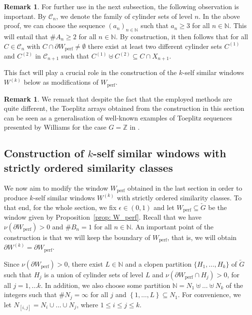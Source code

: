 \documentclass[titlepage,reqno,10pt]{amsart}
\theoremstyle{definition}
\newtheorem{remark}[theorem]{Remark}
\def\Z{{\mathbb Z}}
\def\N{{\mathbb N}}
\newcommand{\set}[1]{\left\{ #1 \right\}}
\newcommand{\tm}{\subseteq}
\begin{document}
\begin{remark}
    \label{rem: number of retained cylinders}
    For further use in the next subsection, the following observation is important. By $\mathcal{C}_n$, we denote the family of cylinder sets of level $n$. In the above proof, we can choose the sequence $(a_n)_{n\in\N}$ such that $a_n\geq 3$ for all $n\in\mathbb{N}$. This will entail that $\# A_n\geq 2$ for all $n\in\N$. By construction, it then follows that for all $C\in \mathcal{C}_n$ with $C\cap \partial W_{\mathrm{perf}}\neq \emptyset$ there exist at least two different cylinder sets $C^{(1)}$ and $C^{(2)}$ in $\mathcal{C}_{n+1}$ such that $C^{(1)}\uplus C^{(2)}\tm C \cap X_{n+1}$. 

    This fact will play a crucial role in the construction of the $k$-self similar windows $W^{(k)}$ below as modifications of $W_\mathrm{perf}$. 
\end{remark}

\begin{remark} 
We remark that despite the fact that the employed methods are quite different, the Toeplitz arrays obtained from the construction in this section can be seen as a generalisation of  well-known examples of Toeplitz sequences presented by Williams for the case $G=\Z$ in \cite[Section 4]{Wi84}. 
\end{remark}

\subsection{Construction of $k$-self similar windows with strictly ordered similarity classes} \label{subsect: k-self similar windows}
We now aim to modify the window $W_\mathrm{perf}$ obtained in the last section in order to produce $k$-self similar windows $W^{(k)}$ with strictly ordered similarity classes. To that end, for the whole section, we fix $\epsilon\in (0,1)$ and let $W_{\mathrm{perf}}\tm \overleftarrow{G}$ be the window given by Proposition~\ref{prop: W_perf}. Recall that we have $\nu(\partial W_\mathrm{perf})>0$ and $\# B_n = 1$ for all $n\in\N$. An important point of the construction is that we will keep the boundary of $W_\mathrm{perf}$, that is, we will obtain $\partial W^{(k)}=\partial W_\mathrm{perf}$. \medskip

Since $\nu(\partial W_\mathrm{perf})>0$, there exist $L\in\mathbb{N}$ and a clopen partition $\{H_1,\ldots, H_k\}$ of $\overleftarrow{G}$ such that  $H_j$ is a union of cylinder sets of level $L$ and $\nu(\partial W_\mathrm{perf} \cap H_j) >0$, for all $j=1,\ldots k$. In addition, we also choose some partition $\N = N_1\uplus \ldots \uplus N_k$ of the integers such that $\# N_j = \infty$ for all $j$ and $\set{1,\ldots, L}\subseteq N_1$. 
For convenience, we let $N_{[i,j]} = N_i\cup\ldots\cup N_j$, where $1\leq i\leq j\leq k$.
\end{document}
